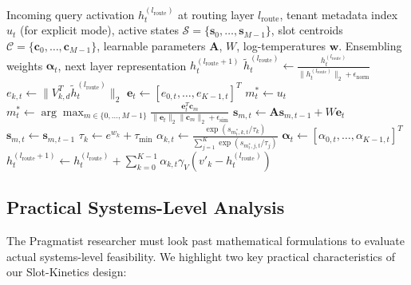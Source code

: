 \begin{algorithm}[tb]
\caption{Tenant-Decoupled Stateful Routing (TDSR)}
\label{alg:tdsr}
\begin{algorithmic}[1]
 Incoming query activation $h_t^{(l_{\text{route}})}$ at routing layer $l_{\text{route}}$, tenant metadata index $u_t$ (for explicit mode), active states $\mathcal{S} = \{\mathbf{s}_0, \dots, \mathbf{s}_{M-1}\}$, slot centroids $\mathcal{C} = \{\mathbf{c}_0, \dots, \mathbf{c}_{M-1}\}$, learnable parameters $\mathbf{A}$, $W$, log-temperatures $\mathbf{w}$.
 Ensembling weights $\boldsymbol{\alpha}_t$, next layer representation $h_t^{(l_{\text{route}} + 1)}$
\STATE {}
\STATE $\tilde{h}_t^{(l_{\text{route}})} \leftarrow \frac{h_t^{(l_{\text{route}})}}{\|h_t^{(l_{\text{route}})}\|_2 + \epsilon_{\text{norm}}}$
\STATE $e_{k, t} \leftarrow \|V_{k, d}^T \tilde{h}_t^{(l_{\text{route}})}\|_2$
\ENDFOR
\STATE $\mathbf{e}_t \leftarrow [e_{0, t}, \dots, e_{K-1, t}]^T$
\STATE {}
\STATE $m^*_t \leftarrow u_t$
\ELSE
\STATE $m^*_t \leftarrow \arg\max_{m \in \{0, \dots, M-1\}} \frac{\mathbf{e}_t^T \mathbf{c}_m}{\|\mathbf{e}_t\|_2 \|\mathbf{c}_m\|_2 + \epsilon_{\text{sim}}}$
\ENDIF
\STATE {}
\STATE $\mathbf{s}_{m, t} \leftarrow \mathbf{A} \mathbf{s}_{m, t-1} + W \mathbf{e}_t$
\ELSE
\STATE $\mathbf{s}_{m, t} \leftarrow \mathbf{s}_{m, t-1}$ 
\ENDIF
\ENDFOR
\STATE {}
\STATE $\tau_k \leftarrow e^{w_k} + \tau_{\min}$
\STATE $\alpha_{k, t} \leftarrow \frac{\exp(s_{m^*_t, k, t}/\tau_k)}{\sum_{j=1}^K \exp(s_{m^*_t, j, t}/\tau_j)}$
\ENDFOR
\STATE $\boldsymbol{\alpha}_t \leftarrow [\alpha_{0, t}, \dots, \alpha_{K-1, t}]^T$
\STATE {}
\STATE $h_t^{(l_{\text{route}} + 1)} \leftarrow h_t^{(l_{\text{route}})} + \sum_{k=0}^{K-1} \alpha_{k, t} \gamma_V (v'_k - h_t^{(l_{\text{route}})})$
\end{algorithmic}
\end{algorithm}

\subsection{Practical Systems-Level Analysis}
The Pragmatist researcher must look past mathematical formulations to evaluate actual systems-level feasibility. We highlight two key practical characteristics of our Slot-Kinetics design:


